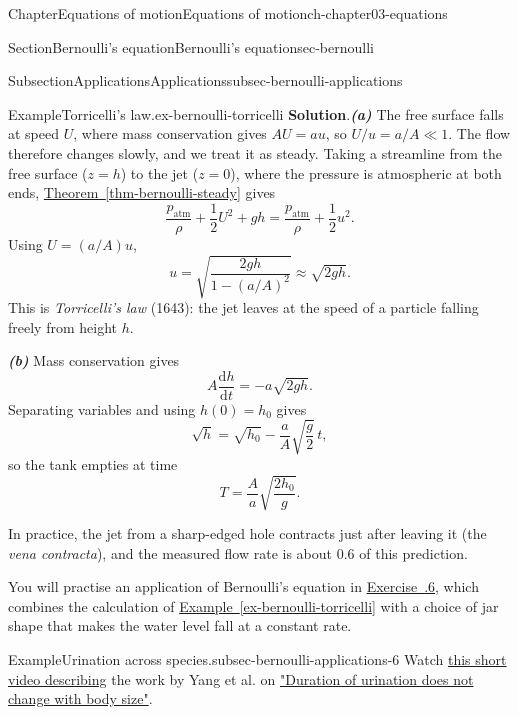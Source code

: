 \documentclass[oneside,10pt,]{book}
\newcommand{\blocktitlefont}{\relax}
\newcommand{\xreffont}{\relax}
\newcommand{\ptxalert}[1]{\textbf{\textit{#1}}}
\numberwithin{equation}{section}
\newcommand{\de}{\mathrm{d}}
\newcommand{\dd}[2]{\frac{\de#1}{\de#2}}
\begin{document}
\begin{chapterptx}{Chapter}{Equations of motion}{}{Equations of motion}{}{}{ch-chapter03-equations}
\begin{sectionptx}{Section}{Bernoulli's equation}{}{Bernoulli's equation}{}{}{sec-bernoulli}
\begin{subsectionptx}{Subsection}{Applications}{}{Applications}{}{}{subsec-bernoulli-applications}
\begin{example}{Example}{Torricelli's law.}{ex-bernoulli-torricelli}
\noindent\textbf{\blocktitlefont Solution}.\hypertarget{ex-bernoulli-torricelli-3}{}\quad{}\ptxalert{(a)} The free surface falls at speed \(U\), where mass conservation gives \(AU = au\), so \(U/u = a/A \ll 1\). The flow therefore changes slowly, and we treat it as steady. Taking a streamline from the free surface (\(z = h\)) to the jet (\(z = 0\)), where the pressure is atmospheric at both ends, \hyperref[thm-bernoulli-steady]{Theorem~{\xreffont\ref{thm-bernoulli-steady}}} gives%
\begin{equation*}
\frac{p_\text{atm}}{\rho} + \frac{1}{2}U^2 + gh = \frac{p_\text{atm}}{\rho} +
\frac{1}{2}u^2.
\end{equation*}
Using \(U = (a/A)u\),%
\begin{equation*}
u = \sqrt{\frac{2gh}{1 - (a/A)^2}} \approx \sqrt{2gh}.
\end{equation*}
This is \emph{Torricelli's law} (1643): the jet leaves at the speed of a particle falling freely from height \(h\).%
\par
\ptxalert{(b)} Mass conservation gives%
\begin{equation*}
A \dd{h}{t} = -a\sqrt{2gh}.
\end{equation*}
Separating variables and using \(h(0) = h_0\) gives%
\begin{equation*}
\sqrt{h} = \sqrt{h_0} - \frac{a}{A}\sqrt{\frac{g}{2}} \, t,
\end{equation*}
so the tank empties at time%
\begin{equation*}
T = \frac{A}{a}\sqrt{\frac{2h_0}{g}}.
\end{equation*}
%
\par
In practice, the jet from a sharp-edged hole contracts just after leaving it (the \emph{vena contracta}), and the measured flow rate is about \(0.6\) of this prediction.%
\end{example}
You will practise an application of Bernoulli's equation in \hyperlink{ex-bernoulli-streamline}{Exercise~{\xreffont 3.6.6}}, which combines the calculation of \hyperref[ex-bernoulli-torricelli]{Example~{\xreffont\ref{ex-bernoulli-torricelli}}} with a choice of jar shape that makes the water level fall at a constant rate.%
\begin{example}{Example}{Urination across species.}{subsec-bernoulli-applications-6}%
Watch \href{https://www.youtube.com/watch?v=EidLGwyYpBE}{this short video describing} the work by Yang et al. on \href{https://www.pnas.org/doi/pdf/10.1073/pnas.1402289111}{"Duration of urination does not change with body size"}.%
\par

\end{example}
\end{subsectionptx}
\end{sectionptx}
\end{chapterptx}
\end{document}
